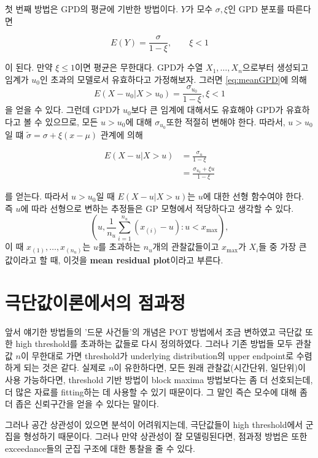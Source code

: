 \documentclass[b5paper,]{scrbook}
\theoremstyle{plain}
\theoremstyle{definition}
\numberwithin{equation}{section}
\begin{document}
첫 번째 방법은 GPD의 평균에 기반한 방법이다. \(Y\)가 모수 \(\sigma, \xi\)인 GPD 분포를 따른다면

\begin{equation}
E(Y)=\frac{\sigma}{1-\xi}, \qquad{\xi<1}
\label{eq:meanGPD}
\end{equation}

이 된다. 만약 \(\xi\leq 1\)이면 평균은 무한대다. GPD가 수열 \(X_{1},\ldots, X_{n}\)으로부터 생성되고 임계가 \(u_{0}\)인 초과의 모델로서 유효하다고 가정해보자. 그러면 \eqref{eq:meanGPD}에 의해
\[E(X-u_{0}|X >u_{0})=\frac{\sigma_{u_{0}}}{1-\xi}, \xi < 1\]
을 얻을 수 있다. 그런데 GPD가 \(u_{0}\)보다 큰 임계에 대해서도 유효해야 GPD가 유효하다고 볼 수 있으므로, 모든 \(u>u_{0}\)에 대해 \(\sigma_{u_{0}}\)또한 적절히 변해야 한다. 따라서, \(u>u_{0}\)일 떄 \(\tilde{\sigma}=\sigma + \xi (x-\mu)\) 관계에 의해

\begin{align*}
E(X-u|X>u)&= \frac{\sigma_{u}}{1-\xi}\\
&=\frac{\sigma_{u_{0}}+\xi u}{1-\xi}
\end{align*}

를 얻는다. 따라서 \(u>u_{0}\)일 때 \(E(X-u|X>u)\)는 \(u\)에 대한 선형 함수여야 한다. 즉 \(u\)에 따라 선형으로 변하는 추정들은 GP 모형에서 적당하다고 생각할 수 있다.
\[(u,\frac{1}{n_{u}}\sum_{i=1}^{n_{u}}(x_{(i)}-u) : u < x_{\max}),\]
이 때 \(x_{(1)},\ldots, x_{(n_{u})}\)는 \(u\)를 초과하는 \(n_{u}\)개의 관찰값들이고 \(x_{\max}\)가 \(X_{i}\)들 중 가장 큰 값이라고 할 때, 이것을 \textbf{mean residual plot}이라고 부른다.

\hypertarget{ppextremes}{%
\chapter{극단값이론에서의 점과정}\label{ppextremes}}

앞서 얘기한 방법들의 '드문 사건들'의 개념은 POT 방법에서 조금 변하였고 극단값 또한 high threshold를 초과하는 값들로 다시 정의하였다. 그러나 기존 방법들 모두 관찰값 \(n\)이 무한대로 가면 threshold가 underlying distribution의 upper endpoint로 수렴하게 되는 것은 같다. 실제로 \(n\)이 유한하다면, 모든 원래 관찰값(시간단위, 일단위)이 사용 가능하다면, threshold 기반 방법이 block maxima 방법보다는 좀 더 선호되는데, 더 많은 자료를 fitting하는 데 사용할 수 있기 때문이다. 그 말인 즉슨 모수에 대해 좀 더 좁은 신뢰구간을 얻을 수 있다는 말이다.

그러나 공간 상관성이 있으면 분석이 어려워지는데, 극단값들이 high threshold에서 군집을 형성하기 때문이다. 그러나 만약 상관성이 잘 모델링된다면, 점과정 방법은 또한 exceedance들의 군집 구조에 대한 통찰을 줄 수 있다.
\end{document}
